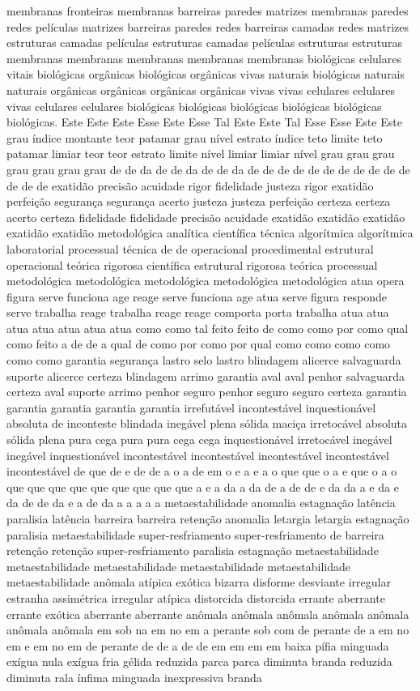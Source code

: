 membranas fronteiras membranas barreiras paredes matrizes membranas paredes redes películas matrizes barreiras paredes redes barreiras camadas redes matrizes estruturas camadas películas estruturas camadas películas estruturas estruturas membranas membranas membranas membranas membranas biológicas celulares vitais biológicas orgânicas biológicas orgânicas vivas naturais biológicas naturais naturais orgânicas orgânicas orgânicas orgânicas vivas vivas celulares celulares vivas celulares celulares biológicas biológicas biológicas biológicas biológicas biológicas. Este Este Este Esse Este Esse Tal Este Este Tal Esse Esse Este Este grau índice montante teor patamar grau nível estrato índice teto limite teto patamar limiar teor teor estrato limite nível limiar limiar nível grau grau grau grau grau grau grau de de da de de da de de da de de de de de de de de de de de de de de exatidão precisão acuidade rigor fidelidade justeza rigor exatidão perfeição segurança segurança acerto justeza justeza perfeição certeza certeza acerto certeza fidelidade fidelidade precisão acuidade exatidão exatidão exatidão exatidão exatidão metodológica analítica científica técnica algorítmica algorítmica laboratorial processual técnica de de operacional procedimental estrutural operacional teórica rigorosa científica estrutural rigorosa teórica processual metodológica metodológica metodológica metodológica metodológica atua opera figura serve funciona age reage serve funciona age atua serve figura responde serve trabalha reage trabalha reage reage comporta porta trabalha atua atua atua atua atua atua atua como como tal feito feito de como como por como qual como feito a de de a qual de como por como por qual como como como como como como garantia segurança lastro selo lastro blindagem alicerce salvaguarda suporte alicerce certeza blindagem arrimo garantia aval aval penhor salvaguarda certeza aval suporte arrimo penhor seguro penhor seguro seguro certeza garantia garantia garantia garantia garantia irrefutável incontestável inquestionável absoluta de inconteste blindada inegável plena sólida maciça irretocável absoluta sólida plena pura cega pura pura cega cega inquestionável irretocável inegável inegável inquestionável incontestável incontestável incontestável incontestável incontestável de que de e de de a o a de em o e a e a o que que o a e que o a o que que que que que que que que que a e a da a da de a de de e da da a e da e da de de da e a de da a a a a a metaestabilidade anomalia estagnação latência paralisia latência barreira barreira retenção anomalia letargia letargia estagnação paralisia metaestabilidade super-resfriamento super-resfriamento de barreira retenção retenção super-resfriamento paralisia estagnação metaestabilidade metaestabilidade metaestabilidade metaestabilidade metaestabilidade metaestabilidade anômala atípica exótica bizarra disforme desviante irregular estranha assimétrica irregular atípica distorcida distorcida errante aberrante errante exótica aberrante aberrante anômala anômala anômala anômala anômala anômala anômala em sob na em no em a perante sob com de perante de a em no em e em no em de perante de de a de de em em em em baixa pífia minguada exígua nula exígua fria gélida reduzida parca parca diminuta branda reduzida diminuta rala ínfima minguada inexpressiva branda 